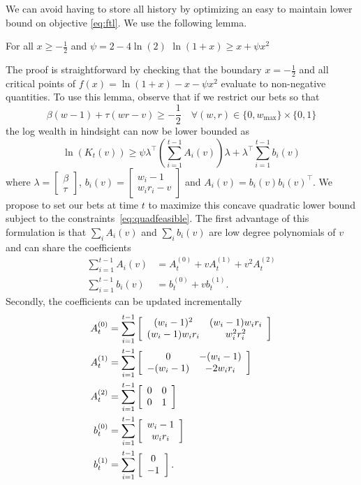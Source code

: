 We can avoid having to store all history by optimizing
an easy to maintain lower bound on objective \eqref{eq:ftl}.
We use the following lemma.
\begin{lemma} 
\label{lem:quadbound}
For all $x\geq -\frac{1}{2}$ and $\psi=2-4\ln(2)$
$
\ln(1+x)\geq x + \psi x^2
$
\end{lemma}
The proof is straightforward by checking that the boundary $x=-\frac{1}{2}$ and all critical points of $f(x) = \ln(1+x)- x - \psi x^2$ evaluate to non-negative quantities. To use this lemma,
observe that if we restrict our bets so that 
\begin{equation}
\beta (w-1)+\tau (wr -v ) \geq -\frac{1}{2} \quad \forall (w,r) \in \{0,w_{\max}\}\times \{0,1\}
\label{eq:quadfeasible}
\end{equation}
the log wealth in hindsight can now be lower bounded as
\[
\ln(K_t(v)) \geq \psi  
\lambda^\top \left(\sum_{i=1}^{t-1} A_i(v)\right) \lambda + \lambda^\top \sum_{i=1}^{t-1} b_i(v)
\]
where $\lambda=
\left[\begin{array}{c} \beta \\ \tau \end{array}\right] 
$,
$b_i(v)=
\left[\begin{array}{c} 
w_i-1 \\ w_i r_i -v 
\end{array}\right] 
$
and 
$
A_i(v) = b_i(v)b_i(v)^\top.
$
We propose to set our bets at time $t$ to maximize this concave quadratic 
lower bound subject to the constraints~\eqref{eq:quadfeasible}. The first 
advantage of this formulation is that 
$\sum_i A_i(v)$ and $\sum_i b_i(v)$ are low degree 
polynomials of $v$ and can share the coefficients
    \begin{align*}
        \sum_{i=1}^{t-1} A_i(v) &= 
        A_t^{(0)} + v A_t^{(1)} + v^2 A_t^{(2)}\\   
        \sum_{i=1}^{t-1} b_i(v) &= b_t^{(0)} + v b_t^{(1)}.  
    \end{align*}
Secondly, the coefficients can be updated incrementally
    \begin{align}
        A_t^{(0)} &=\sum_{i=1}^{t-1}\left[\begin{array}{cc} (w_i-1)^2 & (w_i-1)w_i r_i \\ (w_i-1)w_i r_i & w_i^2r_i^2 \end{array}\right] \label{eq:upsuffa0}\\
        A_t^{(1)} &= \sum_{i=1}^{t-1} \left[\begin{array}{cc} 0 & -(w_i-1) \\ -(w_i-1) & -2w_ir_i \end{array}\right]\\
        A_t^{(2)} &=\sum_{i=1}^{t-1}  \left[\begin{array}{cc} 0 & 0 \\ 0 & 1 \end{array}\right]\\
        b_t^{(0)} &=\sum_{i=1}^{t-1}  \left[\begin{array}{c} w_i-1 \\ w_ir_i \end{array}\right]\\
        b_t^{(1)} &=\sum_{i=1}^{t-1}  \left[\begin{array}{c} 0 \\ -1 \end{array}\right]. \label{eq:upsuffb1}
    \end{align}
